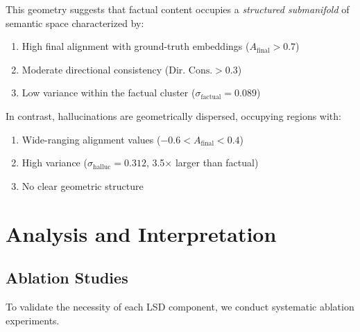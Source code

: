 \documentclass[11pt]{article}
\begin{document}
This geometry suggests that factual content occupies a \emph{structured submanifold} of semantic space characterized by:
\begin{enumerate}[leftmargin=*]
    \item High final alignment with ground-truth embeddings ($A_{\text{final}} > 0.7$)
    \item Moderate directional consistency ($\text{Dir. Cons.} > 0.3$)
    \item Low variance within the factual cluster ($\sigma_{\text{factual}} = 0.089$)
\end{enumerate}

In contrast, hallucinations are geometrically dispersed, occupying regions with:
\begin{enumerate}[leftmargin=*]
    \item Wide-ranging alignment values ($-0.6 < A_{\text{final}} < 0.4$)
    \item High variance ($\sigma_{\text{halluc}} = 0.312$, 3.5$\times$ larger than factual)
    \item No clear geometric structure
\end{enumerate}

\section{Analysis and Interpretation}
\label{sec:analysis}

\subsection{Ablation Studies}

To validate the necessity of each LSD component, we conduct systematic ablation experiments.
\end{document}
